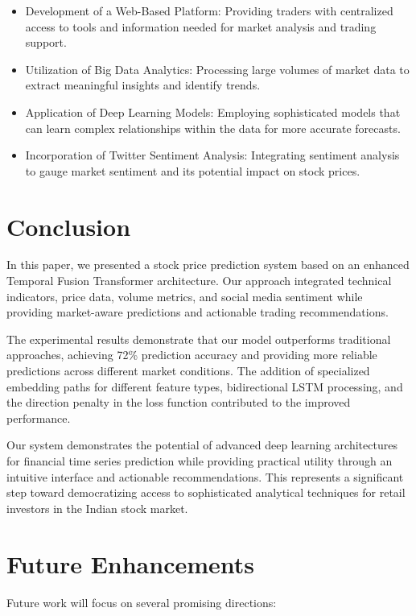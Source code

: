 \documentclass[conference]{IEEEtran}
\begin{document}
\begin{itemize}
\item Development of a Web-Based Platform: Providing traders with centralized access to tools and information needed for market analysis and trading support.

\item Utilization of Big Data Analytics: Processing large volumes of market data to extract meaningful insights and identify trends.

\item Application of Deep Learning Models: Employing sophisticated models that can learn complex relationships within the data for more accurate forecasts.

\item Incorporation of Twitter Sentiment Analysis: Integrating sentiment analysis to gauge market sentiment and its potential impact on stock prices.
\end{itemize}

\section{Conclusion}
In this paper, we presented a stock price prediction system based on an enhanced Temporal Fusion Transformer architecture. Our approach integrated technical indicators, price data, volume metrics, and social media sentiment while providing market-aware predictions and actionable trading recommendations.

The experimental results demonstrate that our model outperforms traditional approaches, achieving 72\% prediction accuracy and providing more reliable predictions across different market conditions. The addition of specialized embedding paths for different feature types, bidirectional LSTM processing, and the direction penalty in the loss function contributed to the improved performance.

Our system demonstrates the potential of advanced deep learning architectures for financial time series prediction while providing practical utility through an intuitive interface and actionable recommendations. This represents a significant step toward democratizing access to sophisticated analytical techniques for retail investors in the Indian stock market.

\section{Future Enhancements}
Future work will focus on several promising directions:
\end{document}
